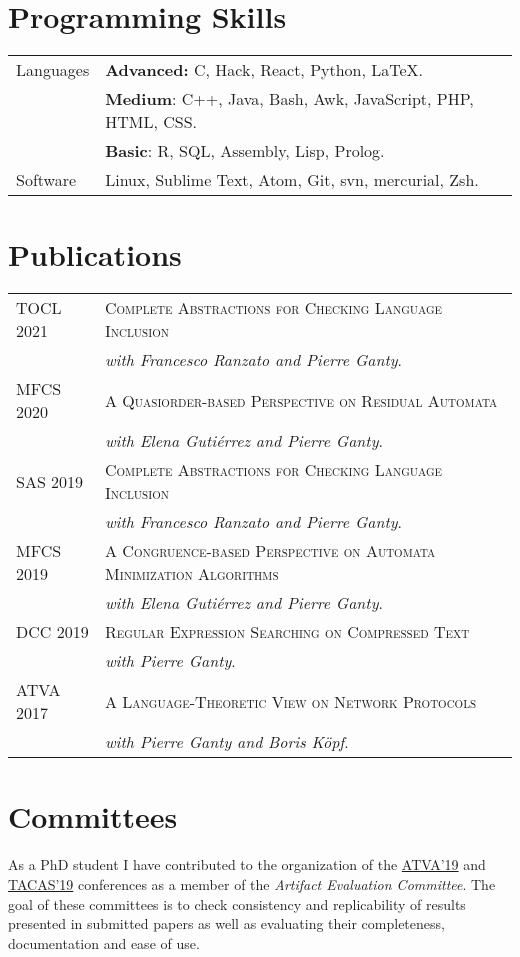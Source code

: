 \documentclass[a4paper,10pt]{article} %
\begin{document}
\section{Programming Skills}
\begin{tabular}{p{2.5cm}p{13.2cm}}
\small{Languages} & \textcolor{azureblue}{\textbf{Advanced:}} C, Hack, React, Python, \LaTeX.\\
[1pt]
& \textcolor{battleshipgrey}{\textbf{Medium}}: C++, Java, Bash, Awk, JavaScript, PHP, HTML, CSS.\\
& \textbf{Basic}: R, SQL, Assembly, Lisp, Prolog.\\
[3pt]
\small{Software} & Linux, Sublime Text, Atom, Git, svn, mercurial, Zsh.\\
\end{tabular}

\section{Publications}
\begin{tabular}{p{2.5cm}p{13.2cm}}
\small{TOCL 2021} & \textsc{Complete Abstractions for Checking Language Inclusion} \\
& \textit{with Francesco Ranzato and Pierre Ganty}. \\
[3pt]
\small{MFCS 2020} & \textsc{A Quasiorder-based Perspective on Residual Automata} \\
& \textit{with Elena Gutiérrez and Pierre Ganty}. \\
[3pt]
\small{SAS 2019} & \textsc{Complete Abstractions for Checking Language Inclusion} \\
& \textit{with Francesco Ranzato and Pierre Ganty}. \\
[3pt]
\small{MFCS 2019} & \textsc{A Congruence-based Perspective on Automata Minimization Algorithms} \\
 & \textit{with Elena Gutiérrez and Pierre Ganty}. \\
[3pt]
\small{DCC 2019} & \textsc{Regular Expression Searching on Compressed Text} \\
 & \textit{with Pierre Ganty}. \\
[3pt]
\small{ATVA 2017} & \textsc{A Language-Theoretic View on Network Protocols} \\
& \textit{with Pierre Ganty and Boris Köpf}. \\
\end{tabular}

\section{Committees}
As a PhD student I have contributed to the organization of the \href{http://atva2019.iis.sinica.edu.tw/organization/}{ATVA'19} and \href{https://conf.researchr.org/track/etaps-2019/tacas-2019-papers#Artifact-Evaluation}{TACAS'19} conferences as a member of the \emph{Artifact Evaluation Committee}.
The goal of these committees is to check consistency and replicability of results presented in submitted papers as well as evaluating their completeness, documentation and ease of use.
\end{document}

